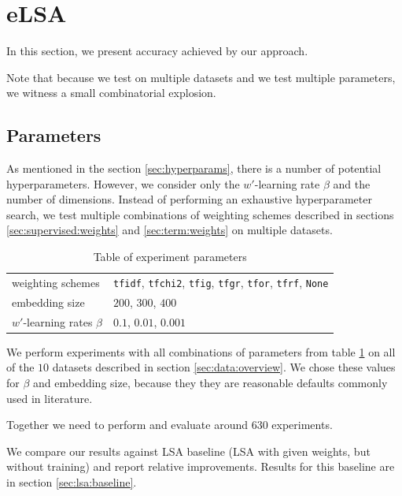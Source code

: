 \section{eLSA}
    
    In this section, we present accuracy achieved by our approach.
    
    Note that because we test on multiple datasets and we test multiple parameters, we witness a small combinatorial explosion.

    \subsection{Parameters}
    
    As mentioned in the section \ref{sec:hyperparams}, there is a number of potential hyperparameters. 
    However, we consider only the $w'$-learning rate $\beta$ and the number of dimensions.
    Instead of performing an exhaustive hyperparameter search, we test multiple combinations of weighting schemes described in sections \ref{sec:supervised:weights} and \ref{sec:term:weights} on multiple datasets. 

    \begin{table}[H]
\begin{center}
\begin{tabular}{l|l}
\toprule
\midrule
weighting schemes & \texttt{tfidf}, \texttt{tfchi2}, \texttt{tfig}, \texttt{tfgr}, \texttt{tfor}, \texttt{tfrf}, \texttt{None} \\
embedding size & $200$, $300$, $400$ \\
$w'$-learning rates $\beta$ & $0.1$, $0.01$, $0.001$\\
\bottomrule
\end{tabular}
\caption[Table of experiment parameters]{Table of experiment parameters}
\label{tab:exp:params}
\end{center}
\end{table}
    
    We perform experiments with all combinations of parameters from table \ref{tab:exp:params} on all of the $10$ datasets described in section \ref{sec:data:overview}.
    We chose these values for $\beta$ and embedding size, because they they are reasonable defaults commonly used in literature.
    
    Together we need to perform and evaluate around $630$ experiments.
    
    We compare our results against LSA baseline (LSA with given weights, but without training) and report relative improvements.
    Results for this baseline are in section \ref{sec:lsa:baseline}.
    
